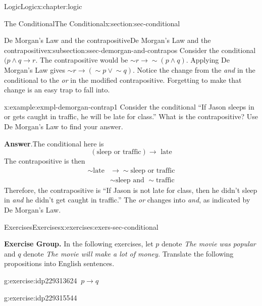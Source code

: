 \documentclass[twoside,10pt,]{book}
\newcommand{\blocktitlefont}{\relax}
\numberwithin{equation}{section}
\newcommand{\conditional}{{p {\rightarrow} q}}
\newcommand{\amp}{&}
\begin{document}
\begin{chapterptx}{Logic}{}{Logic}{}{}{x:chapter:logic}
\begin{sectionptx}{The Conditional}{}{The Conditional}{}{}{x:section:sec-conditional}
\begin{subsectionptx}{De Morgan's Law and the contrapositive}{}{De Morgan's Law and the contrapositive}{}{}{x:subsection:ssec-demorgan-and-contrapos}
Consider the conditional \((p {\wedge}{} q {\rightarrow}{} r\).  The contrapositive would be \(\sim\!{r} {\rightarrow}{} \sim\!{(p {\wedge}{} q)}\).  Applying De Morgan's Law gives \(\sim\!{r} {\rightarrow}{} (\sim\!{p} {\vee}{} \sim\!{q})\).  Notice the change from the \emph{and} in the conditional to the \emph{or} in the modified contrapositive.  Forgetting to make that change is an easy trap to fall into.  \begin{example}{}{x:example:exmpl-demorgan-contrap1}%
Consider the conditional ``If Jason sleeps in or gets caught in traffic, he will be late for class.''  What is the contrapositive?  Use De Morgan's Law to find your answer.\par\smallskip%
\noindent\textbf{\blocktitlefont Answer}.\label{g:answer:idp229311704}{}\hypertarget{g:answer:idp229311704}{}\quad{}The conditional here is%
\begin{equation*}
(\text{sleep or traffic}){\rightarrow}\text{ late}
\end{equation*}
The contrapositive is then%
\begin{align*}
\sim\!{\text{late}} \amp {\rightarrow} \sim\!{\text{sleep or traffic}}\\
\amp \sim\!{\text{sleep}}\text{ and }\sim\!{\text{traffic}}
\end{align*}
Therefore, the contrapositive is ``If Jason is not late for class, then he didn't sleep in \emph{and} he didn't get caught in traffic.''  The \emph{or} changes into \emph{and}, as indicated by De Morgan's Law.\end{example}
%
\end{subsectionptx}
%
%
\typeout{************************************************}
\typeout{************************************************}
%
\begin{exercises-subsection}{Exercises}{}{Exercises}{}{}{x:exercises:exers-sec-conditional}
\par\medskip\noindent%
\textbf{Exercise Group.}\space\space%
In the following exercises, let \(p\) denote \emph{The movie was popular} and \(q\) denote \emph{The movie will make a lot of money.}  Translate the following propositions into English sentences.\begin{exercisegroup}
\begin{divisionexerciseeg}{1}{}{}{g:exercise:idp229313624}%
\(\ \conditional\)\end{divisionexerciseeg}%
\begin{divisionexerciseeg}{2}{}{}{g:exercise:idp229315544}%

\end{divisionexerciseeg}
\end{exercisegroup}
\end{exercises-subsection}
\end{sectionptx}
\end{chapterptx}
\end{document}
